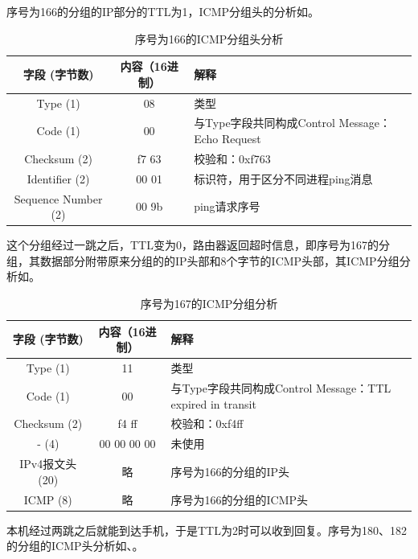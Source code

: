 \documentclass[lang=cn,11pt,a4paper,cite=authornum]{paper}
\begin{document}
序号为166的分组的IP部分的TTL为1，ICMP分组头的分析如。

\begin{table}[!htbp]
    \centering
    \caption{序号为166的ICMP分组头分析\label{tab:icmp3res}}
    \begin{tabular}{|c|c|l|}
        \hline
        字段 (字节数) & 内容（16进制） & 解释 \\
        \hline
        Type (1) & 08 & 类型 \\
        \hline
        Code (1) & 00 & 与Type字段共同构成Control Message：Echo Request \\
        \hline
        Checksum (2) & f7 63 & 校验和：0xf763 \\
        \hline
        Identifier (2) & 00 01 & 标识符，用于区分不同进程ping消息 \\
        \hline
        Sequence Number (2) & 00 9b & ping请求序号 \\
        \hline
    \end{tabular}
\end{table}

这个分组经过一跳之后，TTL变为0，路由器返回超时信息，即序号为167的分组，其数据部分附带原来分组的的IP头部和8个字节的ICMP头部，其ICMP分组分析如。

\begin{table}[!htbp]
    \centering
    \caption{序号为167的ICMP分组分析\label{tab:icmp4res}}
    \begin{tabular}{|c|c|l|}
        \hline
        字段 (字节数) & 内容（16进制） & 解释 \\
        \hline
        Type (1) & 11 & 类型 \\
        \hline
        Code (1) & 00 & 与Type字段共同构成Control Message：TTL expired in transit \\
        \hline
        Checksum (2) & f4 ff & 校验和：0xf4ff \\
        \hline
        - (4) & 00 00 00 00 & 未使用 \\
        \hline
        IPv4报文头 (20) & 略 & 序号为166的分组的IP头 \\ 
        \hline
        ICMP (8) & 略 & 序号为166的分组的ICMP头 \\
        \hline
    \end{tabular}
\end{table}

本机经过两跳之后就能到达手机，于是TTL为2时可以收到回复。序号为180、182的分组的ICMP头分析如、。
\end{document}
